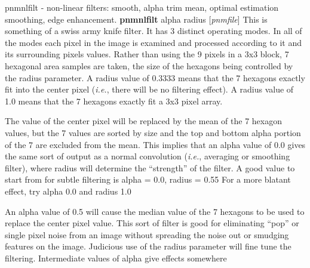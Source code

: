 %

\newpage
%

pnmnlfilt - non-linear filters: smooth, alpha trim mean, optimal
estimation smoothing, edge enhancement.
{\bf pnmnlfilt}
{\rm alpha}
{\rm radius}
{\rm [}{\it pnmfile}{\rm ]}
This is something of a swiss army knife filter. It has 3 distinct operating
modes. In all of the modes each pixel in the image is examined and processed
according to it and its surrounding pixels values. Rather than using the
9 pixels in a 3x3 block, 7 hexagonal area samples are taken, the size of
the hexagons being controlled by the radius parameter. A radius value of
0.3333 means that the 7 hexagons exactly fit into the center pixel ({\it i.e.},
there will be no filtering effect). A radius value of 1.0 means that
the 7 hexagons exactly fit a 3x3 pixel array.
\par
The value of the center pixel will be
replaced by the mean of the 7 hexagon values, but the 7 values are
sorted by size and the top and bottom alpha portion of the 7 are
excluded from the mean.  This implies that an alpha value of 0.0 gives
the same sort of output as a normal convolution ({\it i.e.}, averaging or
smoothing filter), where radius will determine the ``strength'' of the
filter. A good value to start from for subtle filtering is alpha = 0.0, radius = 0.55
For a more blatant effect, try alpha 0.0 and radius 1.0
\par
An alpha value of 0.5 will cause the median value of the
7 hexagons to be used to replace the center pixel value. This sort
of filter is good for eliminating ``pop'' or single pixel noise from
an image without spreading the noise out or smudging features on
the image. Judicious use of the radius parameter will fine tune the
filtering. Intermediate values of alpha give effects somewhere
